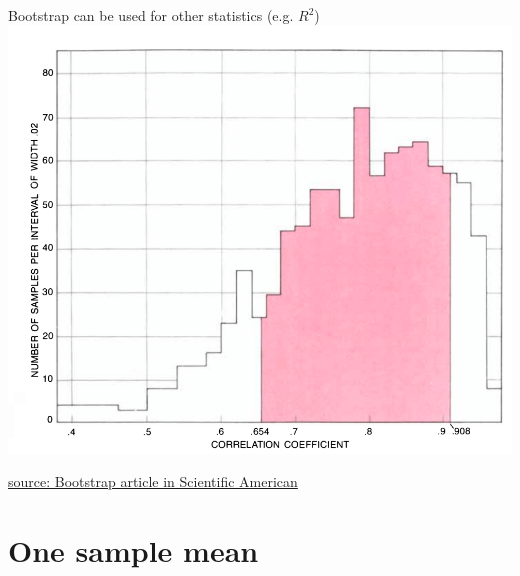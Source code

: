 \documentclass[10pt,handout]{beamer}\usepackage[]{graphicx}\usepackage[]{color}
\begin{document}
\begin{frame}{Bootstrap can be used for other statistics (e.g. $R^2$)}
	\centering
	\includegraphics[scale=0.29]{bootcorr.png}
	
	\vspace{0.1in}
	
	\tiny \href{https://www.dropbox.com/s/cxiq70zxxtyxlb5/EfronDiaconisBootstrap.pdf?dl=0}{source: Bootstrap article in Scientific American}
\end{frame}


\section{One sample mean}
\end{document}

